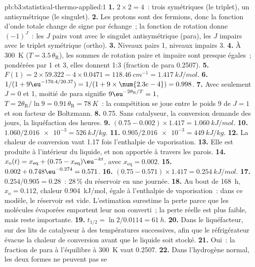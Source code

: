 \begin{solution}{pb:b3:statistical-thermo-applied:1}
\textbf{1.} $2 \times 2 = 4$~: trois symétriques (le triplet), un
antisymétrique (le singulet).
\textbf{2.} Les protons sont des fermions, donc la fonction d'onde totale
change de signe par échange~; la fonction de rotation donne $(-1)^J$~:
les $J$ pairs vont avec le singulet antisymétrique (para), les $J$
impairs avec le triplet symétrique (ortho).
\textbf{3.} Niveaux pairs 1, niveaux impairs 3.
\textbf{4.} À \qty{300}{K} ($T = 3.5\,\theta_{\mathrm R}$), les sommes de
rotation paire et impaire sont presque égales~;
pondérées par 1 et 3, elles donnent 1:3 (fraction de para 0.2507).
\textbf{5.} $F(1) = 2 \times 59.322 - 4 \times 0.0471 = \qty{118.46}{cm^{-1}} = \qty{1.417}{kJ/mol}$.
\textbf{6.} $1/(1 + 9\eu^{-170.4/20.37}) = 1/(1 + 9 \times \num{2.3e-4}) = 0.998$.
\textbf{7.} Avec seulement $J = 0$ et 1, moitié de para signifie
$9\eu^{-2\theta_{\mathrm R}/T} = 1$, $T = 2\theta_{\mathrm R}/\ln9 =
0.91\,\theta_{\mathrm R} = \qty{78}{K}$~: la compétition se joue entre le
poids 9 de $J = 1$ et son facteur de Boltzmann.
\textbf{8.} 0.75. Sans catalyseur, la conversion demande des jours, la
liquéfaction des heures.
\textbf{9.} $(0.75 - 0.002) \times 1.417 = \qty{1.060}{kJ/mol}$.
\textbf{10.} $1.060/\num{2.016e-3} = \qty{526}{kJ/kg}$.
\textbf{11.} $0.905/\num{2.016e-3} = \qty{449}{kJ/kg}$.
\textbf{12.} La chaleur de conversion vaut 1.17 fois l'enthalpie de
vaporisation.
\textbf{13.} Elle est produite à l'intérieur du liquide, et non apportée
à travers les parois.
\textbf{14.} $x_{\mathrm o}(t) = x_{\mathrm{eq}} + (0.75 - x_{\mathrm{eq}})\eu^{-kt}$, avec $x_{\mathrm{eq}} = 0.002$.
\textbf{15.} $0.002 + 0.748\eu^{-0.274} = 0.571$.
\textbf{16.} $(0.75 - 0.571) \times 1.417 = \qty{0.254}{kJ/mol}$.
\textbf{17.} $0.254/0.905 = 0.28$~: 28\,\% du réservoir en une journée.
\textbf{18.} Au bout de \qty{168}{h}, $x_{\mathrm o} = 0.112$, chaleur
\qty{0.904}{kJ/mol}, égale à l'enthalpie de
vaporisation~: dans ce modèle, le réservoir est vide. L'estimation
surestime la perte parce que les molécules évaporées emportent leur
 non converti~; la perte réelle est plus faible, mais
reste importante.
\textbf{19.} $t_{1/2} = \ln2/0.0114 = \qty{61}{h}$.
\textbf{20.} Dans le liquéfacteur, sur des lits de catalyseur à des
températures successives, afin que le réfrigérateur évacue la chaleur de
conversion avant que le liquide soit stocké.
\textbf{21.} Oui~: la fraction de para à l'équilibre à \qty{300}{K} vaut
0.2507.
\textbf{22.} Dans l'hydrogène normal, les deux formes ne peuvent pas se

\end{solution}
